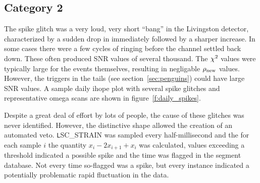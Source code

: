 \subsection{Category 2}


The spike glitch was a very loud, very short ``bang'' in the
Livingston detector, characterized by a sudden drop in \darmerr
immediately followed by a sharper increase.  In some cases there were
a few cycles of ringing before the channel settled back down.  These
often produced SNR values of several thousand.  The $\chi^2$ values
were typically large for the events themselves, resulting in
negligable $\rho_{\textrm{new}}$ values.  However, the triggers in the tails (see
section~\ref{sec:penguins}) could have large SNR values.  A sample
daily ihope plot with several spike glitches and representative omega
scans are shown in figure~\ref{f:daily_spikes}.

Despite a great deal of effort by lots of people, the cause of these
glitches was never identified.  However, the distinctive shape allowed
the creation of an automated veto.  {\texttt LSC\_STRAIN} was sampled
every half-millisecond and the for each sample $i$ the quantity $x_i -
2 x_{i+1} + x_i$ was calculated, values exceeding a threshold
indicated a possible spike and the time was flagged in the segment
database.  Not every time so-flagged was a spike, but every instance
indicated a potentially problematic rapid fluctuation in the data.







